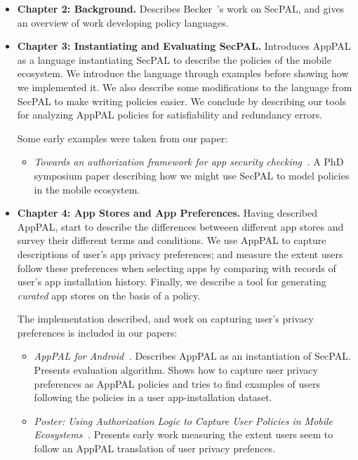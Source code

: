 \documentclass[thesis.tex]{subfiles}
\begin{document}
\begin{itemize}
\item \textbf{Chapter 2: Background.} 
  Describes Becker~\etal's work on SecPAL, and gives an overview of work developing policy languages.

\item \textbf{Chapter 3: Instantiating and Evaluating SecPAL.} 
  Introduces AppPAL as a language instantiating SecPAL to describe the policies
  of the mobile ecosystem. We introduce the language through examples before
  showing how we implemented it. We also describe some modifications to the
  language from SecPAL to make writing policies easier. We conclude by describing
  our tools for analyzing AppPAL policies for satisfiability and redundancy
  errors.
  
  Some early examples were taken from our paper:
  \begin{itemize}
  \item\emph{Towards an authorization framework for app security
      checking~\cite{hallett_towards_2014}.} A PhD symposium paper describing how
    we might use SecPAL to model policies in the mobile ecosystem.
  \end{itemize}

\item \textbf{Chapter 4: App Stores and App Preferences.} 
  Having described AppPAL, start to describe the differences betweeen different
  app stores and survey their different terms and conditions. We use AppPAL to
  capture descriptions of user's app privacy preferences; and measure the extent
  users follow these preferences when selecting apps by comparing with records of
  user's app installation history. Finally, we describe a tool for generating
  \emph{curated} app stores on the basis of a policy.
  
  The implementation described, and work on capturing user's privacy preferences is included in our papers:
  \begin{itemize}
  \item\emph{AppPAL for Android~\cite{hallett_apppal_2016}.} Describes AppPAL as an instantiation of SecPAL.  Presents evaluation algorithm.  Shows how to capture user privacy preferences as AppPAL policies and tries to find examples of users following the policies in a user app-installation dataset.
  \item\emph{Poster: Using Authorization Logic to Capture User Policies in Mobile Ecosystems~\cite{hallett_poster:_2015}.}  Presents early work measuring the extent users seem to follow an AppPAL translation of user privacy prefences.
  \end{itemize}


\end{itemize}
\end{document}
